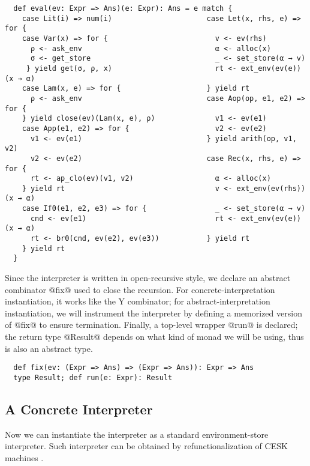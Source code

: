 \begin{lstlisting}
  def eval(ev: Expr => Ans)(e: Expr): Ans = e match {
    case Lit(i) => num(i)                      case Let(x, rhs, e) => for {
    case Var(x) => for {                         v <- ev(rhs)
      ρ <- ask_env                               α <- alloc(x)
      σ <- get_store                             _ <- set_store(α → v)
     } yield get(σ, ρ, x)                        rt <- ext_env(ev(e))(x → α)
    case Lam(x, e) => for {                    } yield rt
      ρ <- ask_env                             case Aop(op, e1, e2) => for {
    } yield close(ev)(Lam(x, e), ρ)              v1 <- ev(e1)                                               
    case App(e1, e2) => for {                    v2 <- ev(e2)
      v1 <- ev(e1)                             } yield arith(op, v1, v2)
      v2 <- ev(e2)                             case Rec(x, rhs, e) => for {
      rt <- ap_clo(ev)(v1, v2)                   α <- alloc(x)
    } yield rt                                   v <- ext_env(ev(rhs))(x → α)
    case If0(e1, e2, e3) => for {                _ <- set_store(α → v)
      cnd <- ev(e1)                              rt <- ext_env(ev(e))(x → α)
      rt <- br0(cnd, ev(e2), ev(e3))           } yield rt                    
    } yield rt
  }
\end{lstlisting}

Since the interpreter is written in open-recursive style, we declare an abstract
combinator @fix@ used to close the recursion. For concrete-interpretation instantiation, it
works like the Y combinator; for abstract-interpretation instantiation, we will
instrument the interpreter by defining a memorized version of @fix@ to ensure
termination. Finally, a top-level wrapper @run@ is declared; the return type
@Result@ depends on what kind of monad we will be using, thus is also an abstract type.

\begin{lstlisting}
  def fix(ev: (Expr => Ans) => (Expr => Ans)): Expr => Ans
  type Result; def run(e: Expr): Result
\end{lstlisting}


\subsection{A Concrete Interpreter} \label{unstaged_conc}

Now we can instantiate the interpreter as a standard environment-store
interpreter. Such interpreter can be obtained by refunctionalization of CESK
machines \cite{Felleisen:1987:CAH:41625.41654, DBLP:conf/ppdp/AgerBDM03}.

